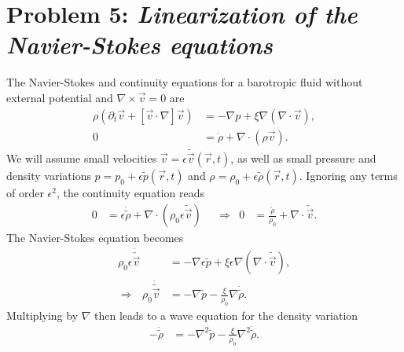 \documentclass[english, parskip=full]{scrartcl}
\newcommand{\intx}{}
\newcommand{\kla}{}
\newcommand{\tecxt}{}
\begin{document}
\section*{Problem 5: \normalfont\textit{\large{Linearization of the Navier-Stokes equations}}}
The Navier-Stokes and continuity equations for a barotropic fluid without external potential and $\nabla\times\vec{v}=0$ are
\begin{align}
\rho\kla\left( {\partial_t\vec{v} + [\vec{v}\cdot\nabla]\vec{v}} \right) &= -\nabla p + \xi \nabla (\nabla\cdot \vec{v}),\\
0 &= \dot{\rho} + \nabla\cdot\kla\left( {\rho\vec{v}} \right).
\end{align}
We will assume small velocities $\vec{v} = \epsilon \tilde{\vec{v}}(\vec{r},t)$, as well as small pressure and density variations $p = p_0 + \epsilon\tilde{p}(\vec{r},t)$ and $\rho = \rho_0 + \epsilon\tilde{\rho}(\vec{r},t)$.
Ignoring any terms of order $\epsilon^2$, the continuity equation reads
\begin{align}
0 &= \epsilon\dot{\tilde{\rho}} + \nabla\cdot \kla\left( {\rho_0\epsilon\tilde{\vec{v}}} \right) &&\Rightarrow & 0 &= \frac{\dot{\tilde{\rho}}}{\rho_0} + \nabla\cdot \tilde{\vec{v}}.
\end{align}
The Navier-Stokes equation becomes
\begin{align}
\rho_0\epsilon\dot{\tilde{\vec{v}}} &= -\nabla\epsilon\tilde{p} + \xi\epsilon\nabla \kla\left( {\nabla\cdot \tilde{\vec{v}}} \right),\\
\Rightarrow\ \ \ \rho_0\dot{\tilde{\vec{v}}} &= -\nabla\tilde{p} - \frac{\xi}{\rho_0}\nabla\dot{\tilde{\rho}}.
\end{align}
Multiplying by $\nabla$ then leads to a wave equation for the density variation
\begin{align}
-\ddot{\tilde{\rho}} &= -\nabla^2\tilde{p} - \frac{\xi}{\rho_0}\nabla^2\dot{\tilde{\rho}}.
\end{align}
\end{document}
